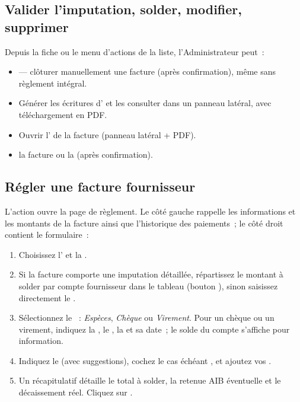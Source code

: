 \subsection{Valider l'imputation, solder, modifier, supprimer}

Depuis la fiche ou le menu d'actions de la liste, l'Administrateur peut~:

\begin{itemize}
  \item {} — clôturer manuellement une facture (après confirmation), même sans règlement intégral.
  \item Générer les écritures d' et les consulter dans un panneau latéral, avec téléchargement en PDF.
  \item Ouvrir l' de la facture (panneau latéral + PDF).
  \item {} la facture ou la  (après confirmation).
\end{itemize}


\subsection{Régler une facture fournisseur}

L'action  ouvre la page de règlement. Le côté gauche rappelle les informations et les montants de la facture ainsi que l'historique des paiements~; le côté droit contient le formulaire~:

\begin{enumerate}
  \item Choisissez l' et la .
  \item Si la facture comporte une imputation détaillée, répartissez le montant à solder par compte fournisseur dans le tableau (bouton ), sinon saisissez directement le .
  \item Sélectionnez le ~: \emph{Espèces}, \emph{Chèque} ou \emph{Virement}. Pour un chèque ou un virement, indiquez la , le , la  et sa date~; le solde du compte s'affiche pour information.
  \item Indiquez le  (avec suggestions), cochez le cas échéant , et ajoutez vos .
  \item Un récapitulatif détaille le total à solder, la retenue AIB éventuelle et le décaissement réel. Cliquez sur .
\end{enumerate}

